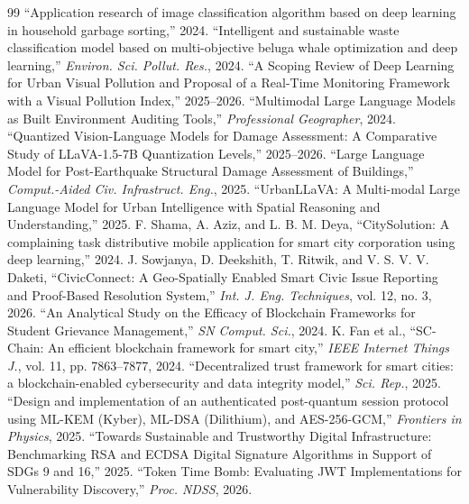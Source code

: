 \documentclass[conference]{IEEEtran}
\begin{document}
\begin{thebibliography}{99}
 ``Application research of image classification algorithm based on deep learning in household garbage sorting,'' 2024.
 ``Intelligent and sustainable waste classification model based on multi-objective beluga whale optimization and deep learning,'' \emph{Environ. Sci. Pollut. Res.}, 2024.
 ``A Scoping Review of Deep Learning for Urban Visual Pollution and Proposal of a Real-Time Monitoring Framework with a Visual Pollution Index,'' 2025--2026.
 ``Multimodal Large Language Models as Built Environment Auditing Tools,'' \emph{Professional Geographer}, 2024.
 ``Quantized Vision-Language Models for Damage Assessment: A Comparative Study of LLaVA-1.5-7B Quantization Levels,'' 2025--2026.
 ``Large Language Model for Post-Earthquake Structural Damage Assessment of Buildings,'' \emph{Comput.-Aided Civ. Infrastruct. Eng.}, 2025.
 ``UrbanLLaVA: A Multi-modal Large Language Model for Urban Intelligence with Spatial Reasoning and Understanding,'' 2025.
 F. Shama, A. Aziz, and L. B. M. Deya, ``CitySolution: A complaining task distributive mobile application for smart city corporation using deep learning,'' 2024.
 J. Sowjanya, D. Deekshith, T. Ritwik, and V. S. V. V. Daketi, ``CivicConnect: A Geo-Spatially Enabled Smart Civic Issue Reporting and Proof-Based Resolution System,'' \emph{Int. J. Eng. Techniques}, vol. 12, no. 3, 2026.
 ``An Analytical Study on the Efficacy of Blockchain Frameworks for Student Grievance Management,'' \emph{SN Comput. Sci.}, 2024.
 K. Fan et al., ``SC-Chain: An efficient blockchain framework for smart city,'' \emph{IEEE Internet Things J.}, vol. 11, pp. 7863--7877, 2024.
 ``Decentralized trust framework for smart cities: a blockchain-enabled cybersecurity and data integrity model,'' \emph{Sci. Rep.}, 2025.
 ``Design and implementation of an authenticated post-quantum session protocol using ML-KEM (Kyber), ML-DSA (Dilithium), and AES-256-GCM,'' \emph{Frontiers in Physics}, 2025.
 ``Towards Sustainable and Trustworthy Digital Infrastructure: Benchmarking RSA and ECDSA Digital Signature Algorithms in Support of SDGs 9 and 16,'' 2025.
 ``Token Time Bomb: Evaluating JWT Implementations for Vulnerability Discovery,'' \emph{Proc. NDSS}, 2026.

\end{thebibliography}
\end{document}
